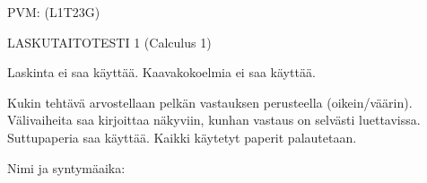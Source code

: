 \documentclass[finnish, a4paper, 12pt]{article}
\begin{document}
	
	
		PVM: \underline{\phantom{mm.mm.}}
		\hfill
		(L1T23G)	%
	
	\begin{center}
		{\large
			LASKUTAITOTESTI 1 (Calculus 1)}
	\end{center}
	
	Laskinta ei saa käyttää. Kaavakokoelmia ei saa käyttää.
	
	Kukin tehtävä arvostellaan pelkän vastauksen perusteella (oikein/väärin).
	Välivaiheita saa kirjoittaa näkyviin, kunhan vastaus on selvästi luettavissa.
	Suttupaperia saa käyttää. Kaikki käytetyt paperit palautetaan.
	
\vspace{12pt}
Nimi ja syntymäaika: \phantom{m} \hrulefill
\vspace{8pt}
	
\end{document}
